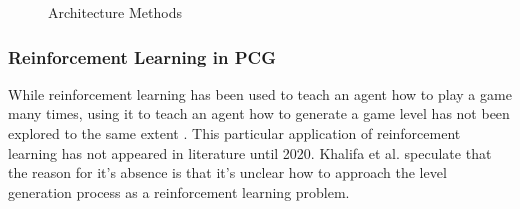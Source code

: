 \documentclass[11pt, oneside]{article}
\begin{document}
\begin{normalsize}
\begin{figure}[H]%
    \centering
    \qquad
    \caption{Architecture Methods}%
    \label{fig:tile}%
\end{figure}

\subsubsection{Reinforcement Learning in PCG}

While reinforcement learning has been used to teach an agent how to play a game many times, using it to teach an agent how to generate a game level has not been explored to the same extent \cite{khalifa2020pcgrl}. This particular application of reinforcement learning has not appeared in literature until 2020. Khalifa et al. speculate that the reason for it's absence is that it's unclear how to approach the level generation process as a reinforcement learning problem.


\end{normalsize}
\end{document}
